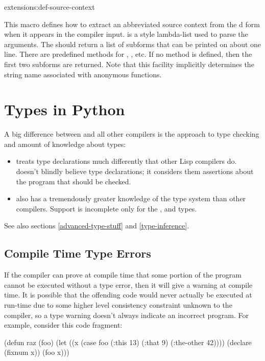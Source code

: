 \begin{defmac}{extensions:}{def-source-context}{%
    }
  
  This macro defines how to extract an abbreviated source context from
  the d form when it appears in the compiler input.
   is a  style lambda-list used to
  parse the arguments.  The  should return a list of
  subforms that can be printed on about one line.  There are
  predefined methods for , , etc.  If
  no method is defined, then the first two subforms are returned.
  Note that this facility implicitly determines the string name
  associated with anonymous functions.
\end{defmac}


\section{Types in Python}

A big difference between \python{} and all other \llisp{} compilers
is the approach to type checking and amount of knowledge about types:
\begin{itemize}
  
\item \python{} treats type declarations much differently that other
  Lisp compilers do.  \python{} doesn't blindly believe type
  declarations; it considers them assertions about the program that
  should be checked.
  
\item \python{} also has a tremendously greater knowledge of the
  \clisp{} type system than other compilers.  Support is incomplete
  only for the ,  and  types.
\end{itemize}
See also sections \ref{advanced-type-stuff} and \ref{type-inference}.


\subsection{Compile Time Type Errors}

If the compiler can prove at compile time that some portion of the
program cannot be executed without a type error, then it will give a
warning at compile time.  It is possible that the offending code would
never actually be executed at run-time due to some higher level
consistency constraint unknown to the compiler, so a type warning
doesn't always indicate an incorrect program.  For example, consider
this code fragment:
\begin{lisp}
(defun raz (foo)
  (let ((x (case foo
             (:this 13)
             (:that 9)
             (:the-other 42))))
    (declare (fixnum x))
    (foo x)))
\end{lisp}

